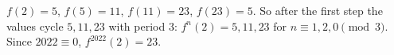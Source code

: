 $f(2)=5$, $f(5)=11$, $f(11)=23$, $f(23)=5$. So after the first step the values cycle $5,11,23$ with period $3$: $f^n(2)=5,11,23$ for $n\equiv1,2,0\pmod3$. Since $2022\equiv0$, $f^{2022}(2)=\boxed{23}$.
